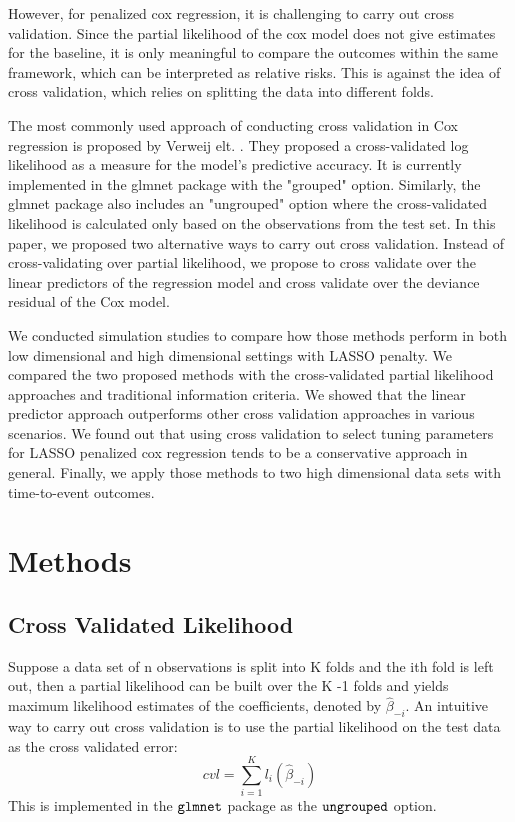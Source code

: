 \documentclass{article}\usepackage[]{graphicx}\usepackage[]{color}
\begin{document}
However, for penalized cox regression, it is challenging to carry out cross validation. Since the partial likelihood of the cox model does not give estimates for the baseline, it is only meaningful to compare the outcomes within the same framework, which can be interpreted as relative risks. This is against the idea of cross validation, which relies on splitting the data into different folds.

\par The most commonly used approach of conducting cross validation in Cox regression is proposed by Verweij elt. \citep{Verweij1993}. They proposed a cross-validated log likelihood as a measure for the model's predictive accuracy.  It is currently implemented in the glmnet package with the "grouped" option. Similarly, the glmnet package also includes an "ungrouped" option where the cross-validated likelihood is calculated only based on the observations from the test set. In this paper, we proposed two alternative ways to carry out cross validation. Instead of cross-validating over partial likelihood, we propose to cross validate over the linear predictors of the regression model and cross validate over the deviance residual \citep{Therneau1990}of the Cox model. 

\par We conducted simulation studies to compare how those methods perform in both low dimensional and high dimensional settings with LASSO penalty. We compared the two proposed methods with the cross-validated partial likelihood approaches and traditional information criteria. We showed that the linear predictor approach outperforms other cross validation approaches in various scenarios. We found out that using cross validation to select tuning parameters for LASSO penalized cox regression tends to be a conservative approach in general. Finally, we apply those methods to two high dimensional data sets with time-to-event outcomes.

\section{Methods}

  \subsection{Cross Validated Likelihood} 
Suppose a data set of n observations is split into K folds and the ith fold is left out, then a partial likelihood can be built over the K -1 folds and yields maximum likelihood estimates of the coefficients, denoted by $\hat{\beta}_{-i}$. An intuitive way to carry out cross validation is to use the partial likelihood on the test data as the cross validated error: \begin{equation}cvl = \sum_{i=1}^{K} l_{i}(\hat{\beta}_{-i})\end{equation} This is implemented in the $\tt{glmnet}$ package as the $\tt{ungrouped}$ option. 
\end{document}
